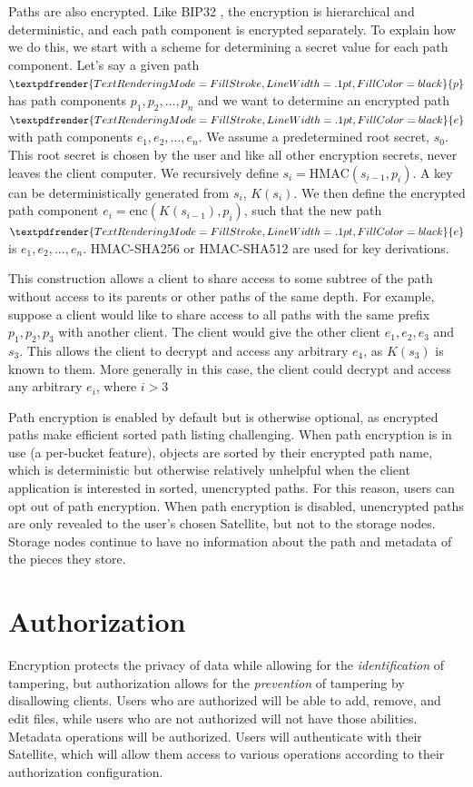 \documentclass[8pt,fleqn,openany]{book}
\newcommand{\semibold}[1]{\textpdfrender{TextRenderingMode=FillStroke,LineWidth=.1pt,FillColor=black}{#1}}
\begin{document}
Paths are also encrypted. Like
BIP32 \cite{bip32}, the encryption is hierarchical and deterministic, and
each path component is encrypted separately. To explain how we do this,
we start with a scheme for determining a secret value for each path
component.
Let's say a given path $\semibold{p}$ has path components $p_1, p_2, \ldots, p_n$
and we want to determine an encrypted path $\semibold{e}$ with path components
$e_1, e_2, \ldots, e_n$.
We assume a predetermined root secret, $s_0$. This root secret is chosen
by the user and like all other encryption secrets, never leaves the client
computer. We recursively define
$s_i = \mbox{HMAC}(s_{i-1}, p_i)$.
A key can be deterministically generated from $s_i$, $K(s_i)$.
We then define the encrypted path component
$e_i = \mbox{enc}(K(s_{i-1}), p_i)$, such that the new path
$\semibold{e}$ is $e_1, e_2, \ldots, e_n$.
HMAC-SHA256 or HMAC-SHA512 are used for key derivations.

This construction allows a client to share access to some subtree of the
path without access to its parents or other paths of the same depth. For
example, suppose a client would like to share access to all paths with the
same prefix $p_1, p_2, p_3$ with another client. The client would give the
other client $e_1, e_2, e_3$ and $s_3$. This allows the client to decrypt
and access any arbitrary $e_4$, as $K(s_3)$ is known to them. More generally
in this case, the client could decrypt and access any arbitrary $e_i$,
where $i > 3$

Path encryption is enabled by default but is otherwise optional, as encrypted
paths make efficient sorted path listing challenging.
When path encryption is in use (a per-bucket feature),
objects are sorted by their encrypted path name, which is deterministic
but otherwise relatively unhelpful
when the client application is interested in sorted, unencrypted paths.
For this reason, users can opt out of
path encryption. When path encryption is disabled, unencrypted paths
are only revealed to the user's chosen Satellite, but not to the storage
nodes. Storage nodes continue to have no information about the path and
metadata of the pieces they store.

\section{Authorization}\label{sec:concrete-authorization}

Encryption protects the privacy of data while allowing for the {\em identification}
of tampering, but authorization allows for the {\em prevention} of tampering by
disallowing clients. Users who are authorized will be able to add, remove,
and edit files, while users who are not authorized will not have those abilities.
Metadata operations will be authorized. Users will authenticate with
their Satellite, which will allow them access to various operations according
to their authorization configuration.
\end{document}
